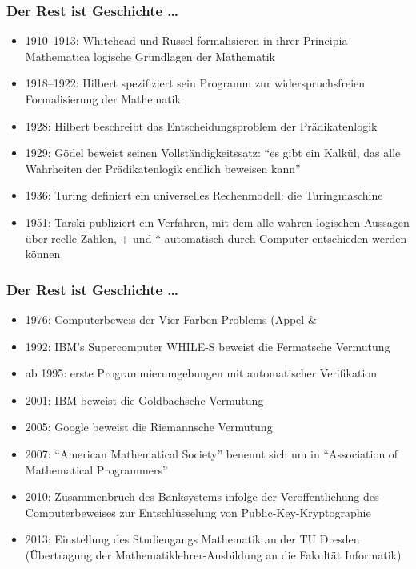 \documentclass[onlymath]{beamer}
\begin{document}
\begin{frame}\frametitle{Der Rest ist Geschichte \ldots}

\begin{itemize}
\item 1910--1913: Whitehead und Russel formalisieren in ihrer \alert{Principia Mathematica} logische Grundlagen der Mathematik\pause
\item 1918--1922: Hilbert spezifiziert sein Programm zur widerspruchsfreien Formalisierung der Mathematik\pause
\item 1928: Hilbert beschreibt das \alert{Entscheidungsproblem} der Prädikatenlogik\pause
\item 1929: Gödel beweist seinen \alert{Vollständigkeitssatz}: "`es gibt ein Kalkül, das alle Wahrheiten der Prädikatenlogik endlich beweisen kann"'\pause
\item 1936: Turing definiert ein universelles Rechenmodell: die \alert{Turingmaschine}\pause
\item 1951: Tarski publiziert ein Verfahren, mit dem alle wahren logischen Aussagen über reelle Zahlen, $+$ und $*$ automatisch durch Computer entschieden werden können
\end{itemize}

\end{frame}

\begin{frame}\frametitle{Der Rest ist Geschichte \ldots}

\begin{itemize}
\item 1976: Computerbeweis der Vier-Farben-Problems (Appel \& \pause
\item 1992: IBM's Supercomputer WHILE-S beweist die Fermatsche Vermutung\pause
\item ab 1995: erste Programmierumgebungen mit automatischer Verifikation\pause
\item 2001: IBM beweist die Goldbachsche Vermutung\pause
\item 2005: Google beweist die Riemannsche Vermutung\pause
\item 2007: "`American Mathematical Society"' benennt sich um in "`Association of Mathematical Programmers"'\pause
\item 2010: Zusammenbruch des Banksystems infolge der Veröffentlichung des Computerbeweises zur Entschlüsselung von Public-Key-Kryptographie\pause
\item 2013: Einstellung des Studiengangs Mathematik an der TU Dresden (Übertragung der Mathematiklehrer-Ausbildung an die Fakultät Informatik)
\end{itemize}

\end{frame}
\end{document}
